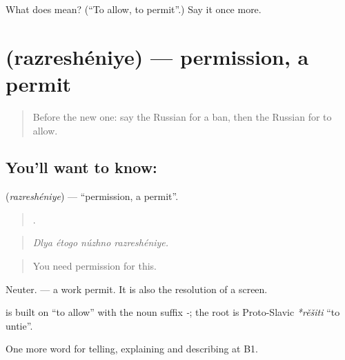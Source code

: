 \begin{tcolorbox}[breakable,colback=teal!4,colframe=teal!35!black,title={Before you move on}]
What does  mean? (\textquotedblleft{}To allow, to permit\textquotedblright{}.) Say it once more.
\end{tcolorbox}
\section[\texorpdfstring{\ru{разрешение} (razreshéniye)}{разрешение (razreshéniye)}]{ (razreshéniye) — permission, a permit}

\label{lesson:RU-C389-razreshenie}



\begin{quote}
Before the new one: say the Russian for a ban, then the Russian for to allow.
\end{quote}

\subsection*{You'll want to know: }
\textbf{} (\emph{razreshéniye}) — \textquotedblleft{}permission, a permit\textquotedblright{}.

\begin{quote}
   .
\end{quote}

\begin{quote}
\emph{Dlya étogo núzhno razreshéniye.}
\end{quote}

\begin{quote}
You need permission for this.
\end{quote}

Neuter. \emph{  } — a work permit. It is also the resolution of a screen.

\begin{cousinweb}
\textbf{} is built on \emph{} \textquotedblleft{}to allow\textquotedblright{} with the noun suffix \emph{-}; the root is Proto-Slavic \emph{*rěšiti} \textquotedblleft{}to untie\textquotedblright{}.
\end{cousinweb}

\begin{grammarlens}[title={What you've built}]
One more word for telling, explaining and describing at B1.
\end{grammarlens}


